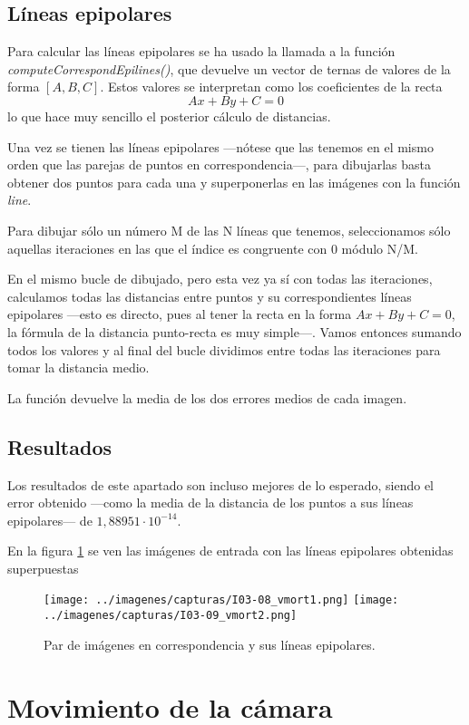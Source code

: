 \documentclass[a4paper, 11pt]{article}
\theoremstyle{definition}
\theoremstyle{theorem}
\begin{document}
    \subsection{Líneas epipolares}
    Para calcular las líneas epipolares se ha usado la llamada a la función \emph{computeCorrespondEpilines()}, que devuelve un vector de ternas de valores de la forma $[A,B,C]$. Estos valores se interpretan como los coeficientes de la recta
    \[
    Ax + By + C = 0
    \]
    lo que hace muy sencillo el posterior cálculo de distancias.

    Una vez se tienen las líneas epipolares ---nótese que las tenemos en el mismo orden que las parejas de puntos en correspondencia---, para dibujarlas basta obtener dos puntos para cada una y superponerlas en las imágenes con la función \emph{line}.

    Para dibujar sólo un número M de las N líneas que tenemos, seleccionamos sólo aquellas iteraciones en las que el índice es congruente con 0 módulo N/M.

    En el mismo bucle de dibujado, pero esta vez ya sí con todas las iteraciones, calculamos todas las distancias entre puntos y su correspondientes líneas epipolares ---esto es directo, pues al tener la recta en la forma $Ax+By+C = 0$, la fórmula de la distancia punto-recta es muy simple---. Vamos entonces sumando todos los valores y al final del bucle dividimos entre todas las iteraciones para tomar la distancia medio.

    La función devuelve la media de los dos errores medios de cada imagen.

    \subsection{Resultados}
    Los resultados de este apartado son incluso mejores de lo esperado, siendo el error obtenido ---como la media de la distancia de los puntos a sus líneas epipolares--- de $1,88951\cdot10^{-14}$.

    En la figura \ref{fig:vmort} se ven las imágenes de entrada con las líneas epipolares obtenidas superpuestas

    \begin{figure}[!htb]
        \texttt{[image: ../imagenes/capturas/I03-08\_vmort1.png]}
        \endminipage\hfill
        \texttt{[image: ../imagenes/capturas/I03-09\_vmort2.png]}
        \endminipage
        \caption{Par de imágenes en correspondencia y sus líneas epipolares.}\label{fig:vmort}
    \end{figure}

    \newpage
    \section{Movimiento de la cámara}
\end{document}
